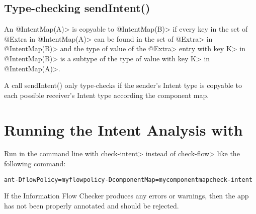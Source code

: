 \subsection{Type-checking sendIntent()}
An \<@IntentMap(A)> is copyable to \<@IntentMap(B)> if every key in the set of
@Extra in \<@IntentMap(A)> can be found in the set of \<@Extra> in
\<@IntentMap(B)> and the type of value of the \<@Extra> entry with key \<K> in
\<@IntentMap(B)> is a subtype of the type of value with key \<K> in
\<@IntentMap(A)>.


A call sendIntent() only type-checks if the sender's Intent type is copyable to
each possible receiver's Intent type according the component map. 

\section{Running the Intent Analysis with \TheFlowChecker{}}

Run \theFlowChecker{} in the command line with \<check-intent> instead of
\<check-flow> like the following command: 


\begin{alltt}
ant -DflowPolicy=myflowpolicy -DcomponentMap=mycomponentmap check-intent
\end{alltt}

If the Information Flow Checker produces any errors or warnings, then the app
has not been properly annotated and should be rejected.

